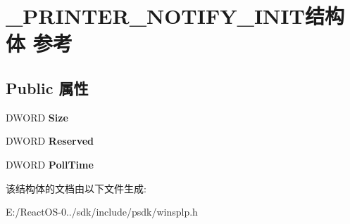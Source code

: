 \hypertarget{struct___p_r_i_n_t_e_r___n_o_t_i_f_y___i_n_i_t}{}\section{\+\_\+\+P\+R\+I\+N\+T\+E\+R\+\_\+\+N\+O\+T\+I\+F\+Y\+\_\+\+I\+N\+I\+T结构体 参考}
\label{struct___p_r_i_n_t_e_r___n_o_t_i_f_y___i_n_i_t}
\subsection*{Public 属性}
\begin{DoxyCompactItemize}
\item 
\mbox{\label{struct___p_r_i_n_t_e_r___n_o_t_i_f_y___i_n_i_t_aed03c1fa3e185f8dd2148a106999f995}} 
D\+W\+O\+RD {\bfseries Size}
\item 
\mbox{\label{struct___p_r_i_n_t_e_r___n_o_t_i_f_y___i_n_i_t_a2286a2cbbfae6b40c78771a84f8509b5}} 
D\+W\+O\+RD {\bfseries Reserved}
\item 
\mbox{\label{struct___p_r_i_n_t_e_r___n_o_t_i_f_y___i_n_i_t_a5a89b73001d3c9ee64f72be30a32c8ae}} 
D\+W\+O\+RD {\bfseries Poll\+Time}
\end{DoxyCompactItemize}


该结构体的文档由以下文件生成\+:\begin{DoxyCompactItemize}
\item 
E\+:/\+React\+O\+S-\/0../sdk/include/psdk/winsplp.\+h\end{DoxyCompactItemize}
